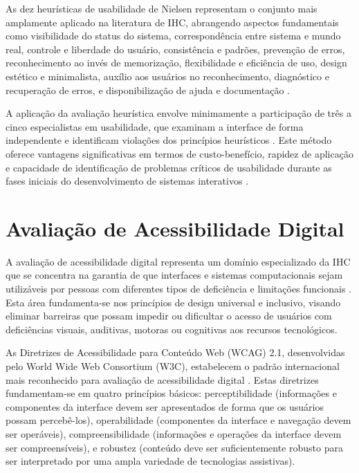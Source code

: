 As dez heurísticas de usabilidade de Nielsen representam o conjunto mais amplamente aplicado na literatura de IHC, abrangendo aspectos fundamentais como visibilidade do status do sistema, correspondência entre sistema e mundo real, controle e liberdade do usuário, consistência e padrões, prevenção de erros, reconhecimento ao invés de memorização, flexibilidade e eficiência de uso, design estético e minimalista, auxílio aos usuários no reconhecimento, diagnóstico e recuperação de erros, e disponibilização de ajuda e documentação \cite{nielsen1995ten}.

A aplicação da avaliação heurística envolve minimamente a participação de três a cinco especialistas em usabilidade, que examinam a interface de forma independente e identificam violações dos princípios heurísticos \cite{nielsen1994finding}. Este método oferece vantagens significativas em termos de custo-benefício, rapidez de aplicação e capacidade de identificação de problemas críticos de usabilidade durante as fases iniciais do desenvolvimento de sistemas interativos \cite{zhang2003comparison}.

\section{Avaliação de Acessibilidade Digital}
A avaliação de acessibilidade digital representa um domínio especializado da IHC que se concentra na garantia de que interfaces e sistemas computacionais sejam utilizáveis por pessoas com diferentes tipos de deficiência e limitações funcionais \cite{petrie2007accessibility}. Esta área fundamenta-se nos princípios de design universal e inclusivo, visando eliminar barreiras que possam impedir ou dificultar o acesso de usuários com deficiências visuais, auditivas, motoras ou cognitivas aos recursos tecnológicos.

As Diretrizes de Acessibilidade para Conteúdo Web (WCAG) 2.1, desenvolvidas pelo World Wide Web Consortium (W3C), estabelecem o padrão internacional mais reconhecido para avaliação de acessibilidade digital \cite{w3c2018wcag}. Estas diretrizes fundamentam-se em quatro princípios básicos: perceptibilidade (informações e componentes da interface devem ser apresentados de forma que os usuários possam percebê-los), operabilidade (componentes da interface e navegação devem ser operáveis), compreensibilidade (informações e operações da interface devem ser compreensíveis), e robustez (conteúdo deve ser suficientemente robusto para ser interpretado por uma ampla variedade de tecnologias assistivas).

